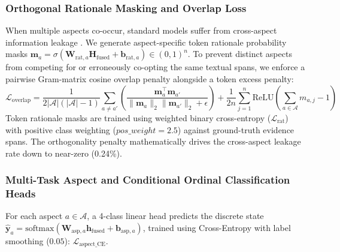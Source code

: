 \documentclass{llncs}
\begin{document}
\subsubsection{Orthogonal Rationale Masking and Overlap Loss}
When multiple aspects co-occur, standard models suffer from cross-aspect information leakage \cite{ref30_tran2026}. We generate aspect-specific token rationale probability masks $\mathbf{m}_a = \sigma(\mathbf{W}_{\text{rat}, a} \mathbf{H}_{\text{fused}} + \mathbf{b}_{\text{rat}, a}) \in (0, 1)^n$. To prevent distinct aspects from competing for or erroneously co-opting the same textual spans, we enforce a pairwise Gram-matrix cosine overlap penalty alongside a token excess penalty:
\begin{equation}
\mathcal{L}_{\text{overlap}} = \frac{1}{2 |\mathcal{A}|(|\mathcal{A}|-1)} \sum_{a \neq a'} \left( \frac{\mathbf{m}_a^\top \mathbf{m}_{a'}}{\|\mathbf{m}_a\|_2 \|\mathbf{m}_{a'}\|_2 + \epsilon} \right) + \frac{1}{2 n} \sum_{j=1}^n \text{ReLU}\left( \sum_{a \in \mathcal{A}} m_{a, j} - 1 \right)
\end{equation}
Token rationale masks are trained using weighted binary cross-entropy ($\mathcal{L}_{\text{rat}}$) with positive class weighting ($pos\_weight = 2.5$) against ground-truth evidence spans. The orthogonality penalty mathematically drives the cross-aspect leakage rate down to near-zero (0.24\%).

\subsubsection{Multi-Task Aspect and Conditional Ordinal Classification Heads}
For each aspect $a \in \mathcal{A}$, a 4-class linear head predicts the discrete state $\hat{\mathbf{y}}_a = \text{softmax}(\mathbf{W}_{\text{asp}, a} \mathbf{h}_{\text{fused}} + \mathbf{b}_{\text{asp}, a})$, trained using Cross-Entropy with label smoothing ($0.05$): $\mathcal{L}_{\text{aspect\_CE}}$.
\end{document}
